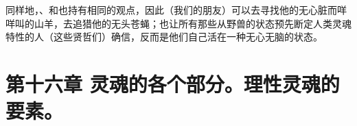 \par

\par

同样地，、和也持有相同的观点，因此（我们的朋友）可以去寻找他的无心脏而咩咩叫的山羊，去追猎他的无头苍蝇；也让所有那些从野兽的状态预先断定人类灵魂特性的人（这些贤哲们）确信，反而是他们自己活在一种无心无脑的状态。\par


\section{第十六章 灵魂的各个部分。理性灵魂的要素。}

